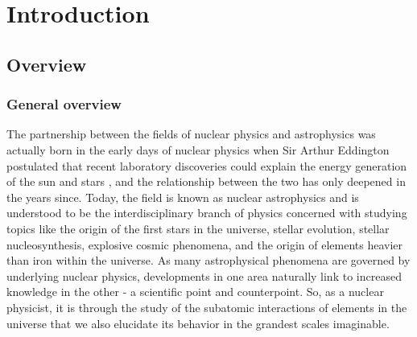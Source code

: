 %
%
%
%
%
%
%
%
%
%


%
%

\chapter{Introduction}
\label{chap: introduction}

\section{Overview}
\label{sec: Nuclear astrophysics overview}

\subsection{General overview}

The partnership between the fields of nuclear physics and astrophysics was actually born in the early days of nuclear physics when Sir Arthur Eddington postulated that recent laboratory discoveries could explain the energy generation of the sun and stars \cite{IliadisBook}, and the relationship between the two has only deepened in the years since. Today, the field is known as nuclear astrophysics and is understood to be the interdisciplinary branch of physics concerned with studying topics like the origin of the first stars in the universe, stellar evolution, stellar nucleosynthesis, explosive cosmic phenomena, and the origin of elements heavier than iron within the universe. As many astrophysical phenomena are governed by underlying nuclear physics, developments in one area naturally link to increased knowledge in the other - a scientific point and counterpoint. So, as a nuclear physicist, it is through the study of the subatomic interactions of elements in the universe that we also elucidate its behavior in the grandest scales imaginable. 

